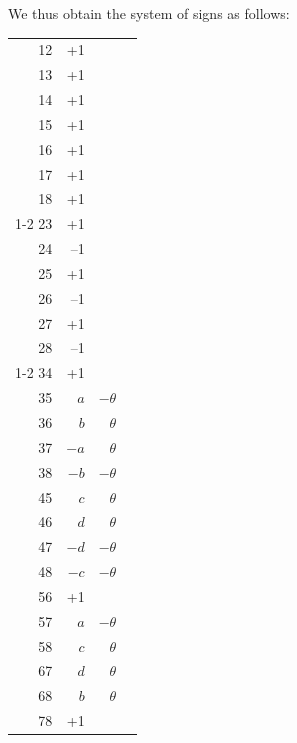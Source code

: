\documentclass[11pt,a4paper]{book}
\begin{document}
We thus obtain the system of signs as follows:

\begin{center}
\begin{tabular}{r @{\quad} r @{\quad} r | r}
12 & +1 & & \\
13 & +1 & & \\
14 & +1 & & \\
15 & +1 & & \\
16 & +1 & & \\
17 & +1 & & \\
18 & +1 & & \\ \cline{1-2}
23 & +1 & & \\
24 & --1 & & \\
25 & +1 & & \\
26 & --1 & & \\
27 & +1 & & \\
28 & --1 & & \\ \cline{1-2}
34 & +1 & & \\
35 & $a$ & $-\theta$ & \\
36 & $b$ & $\theta$ & \\
37 & $-a$ & $\theta$ & \\
38 & $-b$ & $-\theta$ & \\
45 & $c$ & $\theta$ & \\
46 & $d$ & $\theta$ & \\
47 & $-d$ & $-\theta$ & \\
48 & $-c$ & $-\theta$ & \\
56 & +1 & & \\
57 & $a$ & $-\theta$ & \\
58 & $c$ & $\theta$ & \\
67 & $d$ & $\theta$ & \\
68 & $b$ & $\theta$ & \\
78 & +1 & & \\
\end{tabular}
\end{center}
\end{document}
